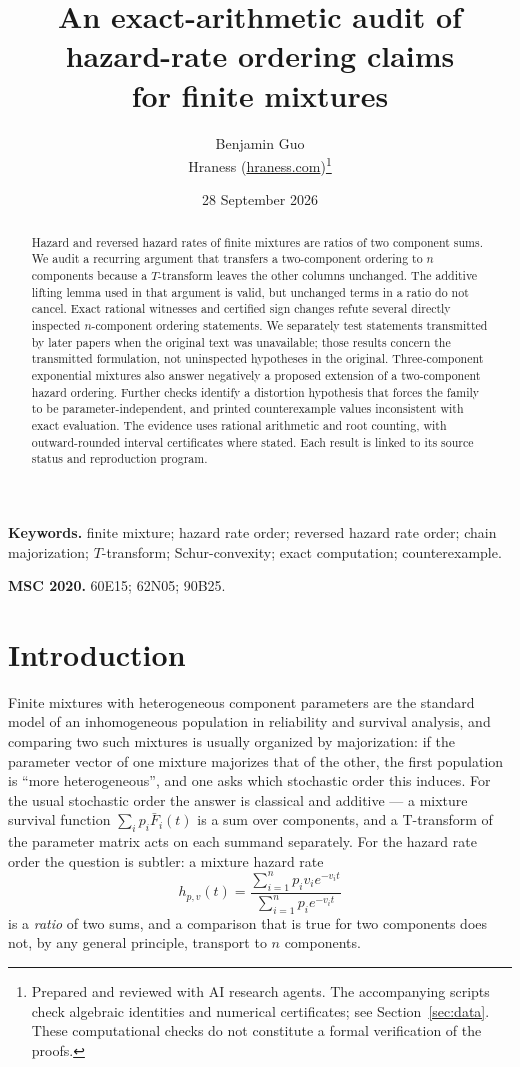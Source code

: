 \documentclass[10pt]{article}
\title{An exact-arithmetic audit of hazard-rate ordering claims\\ for finite mixtures}
\author{Benjamin Guo\\ Hraness (\url{hraness.com})\thanks{Prepared and reviewed with AI research agents. The accompanying scripts check algebraic identities and numerical certificates; see Section~\ref{sec:data}. These computational checks do not constitute a formal verification of the proofs.}}
\date{28 September 2026}
\theoremstyle{plain}
\theoremstyle{definition}
\theoremstyle{remark}
\begin{document}
\maketitle

\begin{abstract}
Hazard and reversed hazard rates of finite mixtures are ratios of two component sums. We audit a recurring argument that transfers a two-component ordering to $n$ components because a $T$-transform leaves the other columns unchanged. The additive lifting lemma used in that argument is valid, but unchanged terms in a ratio do not cancel. Exact rational witnesses and certified sign changes refute several directly inspected $n$-component ordering statements. We separately test statements transmitted by later papers when the original text was unavailable; those results concern the transmitted formulation, not uninspected hypotheses in the original. Three-component exponential mixtures also answer negatively a proposed extension of a two-component hazard ordering. Further checks identify a distortion hypothesis that forces the family to be parameter-independent, and printed counterexample values inconsistent with exact evaluation. The evidence uses rational arithmetic and root counting, with outward-rounded interval certificates where stated. Each result is linked to its source status and reproduction program.
\end{abstract}

\medskip\noindent\textbf{Keywords.} finite mixture; hazard rate order; reversed hazard rate order; chain majorization; $T$-transform; Schur-convexity; exact computation; counterexample.

\noindent\textbf{MSC 2020.} 60E15; 62N05; 90B25.

\section{Introduction}\label{sec:intro}

Finite mixtures with heterogeneous component parameters are the standard model of an inhomogeneous population in reliability and survival analysis, and comparing two such mixtures is usually organized by majorization: if the parameter vector of one mixture majorizes that of the other, the first population is ``more heterogeneous'', and one asks which stochastic order this induces. For the usual stochastic order the answer is classical and additive --- a mixture survival function $\sum_i p_i\bar F_i(t)$ is a sum over components, and a T-transform of the parameter matrix acts on each summand separately. For the hazard rate order the question is subtler: a mixture hazard rate
\begin{equation}\label{eq:hratio}
h_{p,v}(t)=\frac{\sum_{i=1}^n p_i v_i e^{-v_i t}}{\sum_{i=1}^n p_i e^{-v_i t}}
\end{equation}
is a \emph{ratio} of two sums, and a comparison that is true for two components does not, by any general principle, transport to $n$ components.
\end{document}
